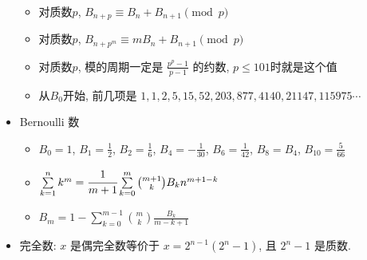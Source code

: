 \documentclass[landscape,a4paper]{article}
\begin{document}
\begin{spacing}{0.3}
\begin{multicols}{2}
\begin{itemize}
\begin{itemize}
  \item 对质数$p$, $B_{n + p} \equiv B_n + B_{n + 1} \pmod{p}$
  \item 对质数$p$, $B_{n + p^m} \equiv mB_n + B_{n + 1} \pmod{p}$
  \item 对质数$p$, 模的周期一定是 $\frac{p^p - 1}{p - 1}$ 的约数, $p \le 101$时就是这个值
  \item 从$B_0$开始, 前几项是 $1, 1, 2, 5, 15, 52, 203, 877, 4140, 21147, 115975 \cdots$
  \end{itemize}
\item Bernoulli 数
  \begin{itemize}
  \item $B_0 = 1$, $B_1 = \frac{1}{2}$, $B_2 = \frac{1}{6}$, $B_4 = -\frac{1}{30}$, $B_6 = \frac{1}{42}$, $B_8 = B_4$, $B_{10} = \frac{5}{66}$
  \item $\sum\limits_{k = 1}^{n} k^m = \cfrac{1}{m + 1} \sum\limits_{k = 0}^{m} \binom{m + 1}{k} B_k n ^ {m + 1 - k} $
  \item $B_m = 1 - \sum\limits_{k = 0}^{m - 1} \binom{m}{k} \frac{B_k}{m - k + 1}$
  \end{itemize}
\item 完全数: $x$ 是偶完全数等价于 $x = 2^{n - 1} (2^n - 1)$, 且 $2^n - 1$ 是质数.
\end{itemize}
\end{multicols}


%


%
%
%
%
	\end{spacing}
\end{document}
